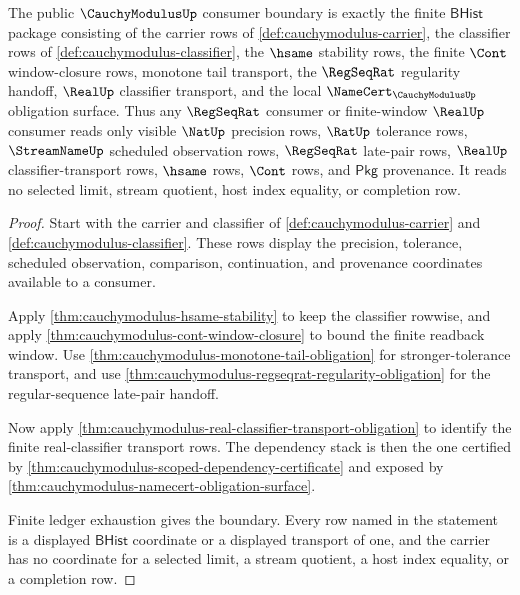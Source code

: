 \begin{theorem}
\label{thm:cauchymodulus-public-consumer-boundary}
The public $\CauchyModulusUp$ consumer boundary is exactly the finite
$\mathsf{BHist}$ package consisting of the carrier rows of
\autoref{def:cauchymodulus-carrier}, the classifier rows of
\autoref{def:cauchymodulus-classifier}, the $\hsame$ stability rows, the
finite $\Cont$ window-closure rows, monotone tail transport, the
$\RegSeqRat$ regularity handoff, $\RealUp$ classifier transport, and the
local $\NameCert_{\CauchyModulusUp}$ obligation surface. Thus any
$\RegSeqRat$ consumer or finite-window $\RealUp$ consumer reads only visible
$\NatUp$ precision rows, $\RatUp$ tolerance rows, $\StreamNameUp$ scheduled
observation rows, $\RegSeqRat$ late-pair rows, $\RealUp$ classifier-transport
rows, $\hsame$ rows, $\Cont$ rows, and $\mathsf{Pkg}$ provenance. It reads no
selected limit, stream quotient, host index equality, or completion row.
\end{theorem}
\begin{proof}
Start with the carrier and classifier of
\autoref{def:cauchymodulus-carrier} and
\autoref{def:cauchymodulus-classifier}. These rows display the precision,
tolerance, scheduled observation, comparison, continuation, and provenance
coordinates available to a consumer.

Apply \autoref{thm:cauchymodulus-hsame-stability} to keep the classifier
rowwise, and apply \autoref{thm:cauchymodulus-cont-window-closure} to bound
the finite readback window. Use
\autoref{thm:cauchymodulus-monotone-tail-obligation} for stronger-tolerance
transport, and use
\autoref{thm:cauchymodulus-regseqrat-regularity-obligation} for the
regular-sequence late-pair handoff.

Now apply \autoref{thm:cauchymodulus-real-classifier-transport-obligation}
to identify the finite real-classifier transport rows. The dependency stack is
then the one certified by
\autoref{thm:cauchymodulus-scoped-dependency-certificate} and exposed by
\autoref{thm:cauchymodulus-namecert-obligation-surface}.

Finite ledger exhaustion gives the boundary. Every row named in the statement
is a displayed $\mathsf{BHist}$ coordinate or a displayed transport of one,
and the carrier has no coordinate for a selected limit, a stream quotient, a
host index equality, or a completion row.
\end{proof}


